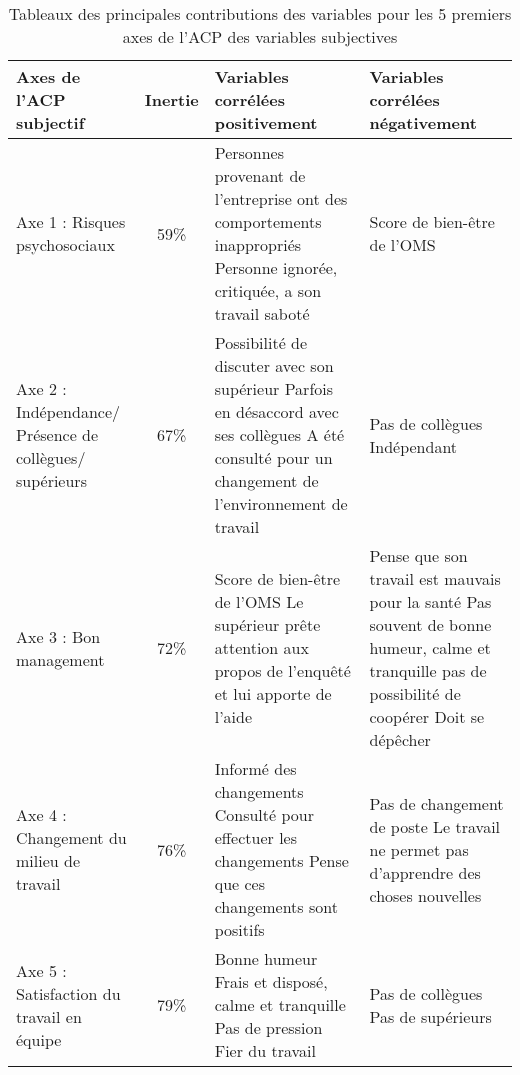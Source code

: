 \documentclass[11pt,fleqn,openany,frenchb]{book} %
\begin{document}
\newpage
\begin{table}[!h]
\centering
\begin{tabular}{|p{3cm}|c|p{4.7cm}|p{4.7cm}|}
	\hline
    Axes de l'ACP \newline subjectif & Inertie & Variables corrélées positivement & Variables corrélées négativement\\ 
    \hline 
    Axe 1 : Risques psychosociaux & 59\% 
    & Personnes provenant de l'entreprise ont des comportements inappropriés 
    \newline Personne ignorée, critiquée, a son travail saboté
    & Score de bien-être de l'OMS\\
    \hline
    Axe 2 : Indépendance/ Présence de collègues/ supérieurs & 67\%
    & Possibilité de discuter avec son supérieur
    \newline Parfois en désaccord avec ses collègues
    \newline A été consulté pour un changement de l'environnement de travail
    & Pas de collègues
    \newline Indépendant \\
    \hline
    Axe 3 : Bon management & 72\%
    & Score de bien-être de l'OMS
    \newline Le supérieur prête attention aux propos de l'enquêté et lui apporte de l'aide
    \newline
    & Pense que son travail est mauvais pour la santé
    \newline Pas souvent de bonne humeur, calme et tranquille
    \newline pas de possibilité de coopérer
    \newline Doit se dépêcher\\
    \hline
    Axe 4 : Changement du milieu de travail & 76\% 
    & Informé des changements
    \newline Consulté pour effectuer les changements
    \newline Pense que ces changements sont positifs
    & Pas de changement de poste
    \newline Le travail ne permet pas d'apprendre des choses nouvelles\\
    \hline
    Axe 5 : Satisfaction du travail en équipe & 79\% 
    & Bonne humeur 
    \newline Frais et disposé, calme et tranquille
    \newline Pas de pression
    \newline Fier du travail
    & Pas de collègues
    \newline Pas de supérieurs\\
    \hline
    
\end{tabular}
\caption{Tableaux des principales contributions des variables pour les 5 premiers axes de l’ACP des variables subjectives}
\label{tab:ACPsubj}
\end{table}
\end{document}
